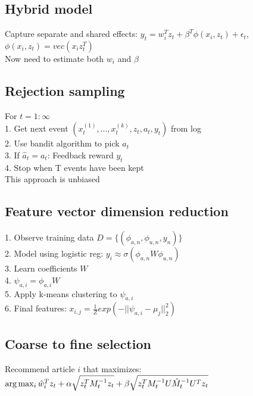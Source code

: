 \subsection*{Hybrid model}
Capture separate and shared effects:
$y_t = w_i^T z_t + \beta^T \phi(x_i, z_t) + \epsilon_t$, $\phi(x_i, z_t) = vec(x_i z_t^T)$\\
Now need to estimate both $w_i$ and $\beta$

\subsection*{Rejection sampling}
For $t=1:\infty$\\
1. Get next event $(x_t^{(1)},...,x_t^{(k)}, z_t, a_t, y_t)$ from log\\
2. Use bandit algorithm to pick $\hat{a}_t$\\
3. If $\hat{a}_t = a_t$: Feedback reward $y_t$\\
4. Stop when T events have been kept\\
This approach is unbiased

\subsection*{Feature vector dimension reduction}
1. Observe training data $D=\{(\phi_{a,n},\phi_{u,n}, y_n)\}$\\
2. Model using logistic reg: $y_i\approx \sigma(\phi_{a,n}W\phi_{u,n})$\\
3. Learn coefficients $W$\\
4. $\psi_{a,i}=\phi_{a,i}W$\\
5. Apply k-means clustering to $\psi_{a,i}$\\
6. Final features: $x_{i,j}=\frac{1}{Z}exp(-||\psi_{a,i}-\mu_j||^2_2)$

\subsection*{Coarse to fine selection}
Recommend article $i$ that maximizes:\\
$\arg\max_i \hat{w}_i^T z_t + \alpha \sqrt{z_t^T M_t^{-1} z_t} +\\
\beta \sqrt{z_t^T M_t^{-1} U \hat{M}_t^{-1} U^T z_t}$